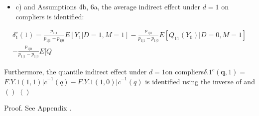 \documentclass{article}
\begin{document}
\begin{itemize}
\item c) and Assumptions 4b, 6a, the average indirect effect under $d = 1$ on compliers
is identified:

\end{itemize}

\begin{equation}
\begin{array} { r } { \delta _ { 1 } ^ { c } ( 1 ) = \frac { p _ { 1 | 1 } } { p _ { 1 | 1 } - p _ { 1 | 0 } } E [ Y _ { 1 } | D = 1, M = 1 ] - \frac { p _ { 1 | 0 } } { p _ { 1 | 1 } - p _ { 1 | 0 } } E [ Q _ { 1 1 } ( Y _ { 0 } ) | D = 0, M = 1 ] } \\ { - \frac { p _ { 1 | 0 } } { p _ { 1 | 1 } - p _ { 1 | 0 } } E [ Q _ {}}\end{array}
\end{equation}


Furthermore, the quantile indirect effect under $d = 1$on compliers${ \delta . { 1 } ^ { c } ( \pmb { q }, 1 ) } =$
$F . { Y . { 1 } ( 1, 1 ) | c } ^ { - 1 } ( q ) - F . { Y . { 1 } ( 1, 0 ) | c } ^ { - 1 } ( q )$ is identified using the inverse of and$( )$ $( )$


Proof. See Appendix .
\end{document}
